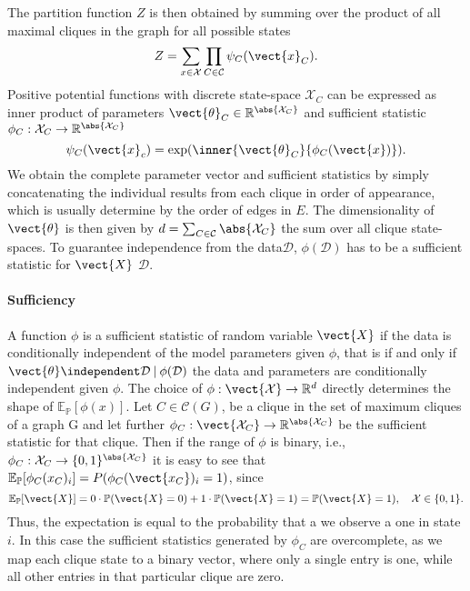 The partition function $Z$ is then obtained by summing over the product of all maximal cliques in the graph for all possible states
\begin{equation}
    Z = \sum_{x\in \mathcal{X}} \prod_{C \in \mathcal{C}} \psi_C(\vect{x}_C).
\end{equation}
Positive potential functions with discrete state-space $\mathcal{X}_C$ can be expressed as inner product of parameters $\vect{\theta}_C \in \mathbb{R}^{\abs{\mathcal{X}_C}}$ and sufficient statistic $\phi_C: \mathcal{X}_C \rightarrow \mathbb{R}^{\abs{\mathcal{X}_C}}$ 
\begin{equation}
    \psi_C(\vect{x}_c) = \exp(\inner{\vect{\theta}_C}{\phi_C(\vect{x})}).
\end{equation}
We obtain the complete parameter vector and sufficient statistics by simply concatenating the individual results from each clique in order of appearance, which is usually determine by the order of edges in $E$.
The dimensionality of $\vect{\theta}$ is then given by $d = \sum_{C \in \mathcal{C}} \abs{\mathcal{X}_C}$ the sum over all clique state-spaces.
To guarantee independence from the data$\mathcal{D}$,  $\phi(\mathcal{D})$ has to be a sufficient statistic for $\vect{X}$ \wrt $\mathcal{D}$.
\paragraph*{Sufficiency}
    A function $\phi$  is a sufficient statistic of random variable $\vect{X}$ if the data is conditionally independent of the model parameters given $\phi$, that is if and only if $\vect{\theta}\independent \mathcal{D} \:\lvert\: \phi(\mathcal{D})$ the data and parameters are conditionally independent given $\phi$.
    The choice of $\phi: \vect{\mathcal{X}} \rightarrow \mathbb{R}^d$ directly determines the shape of  $\mathbb{E}_{\mathbb{P}}[\phi(x)]$.
    Let $C \in \mathcal{C}(G)$, be a clique in the set of maximum cliques of a graph G and let further
    $\phi_C: \vect{\mathcal{X}_C} \rightarrow \mathbb{R}^{\abs{\mathcal{X}_C}}$ be the sufficient statistic for that clique.
    Then if the range of $\phi$ is binary, i.e., $\phi_C : \mathcal{X}_C \rightarrow \{0,1\}^{\abs{\mathcal{X}_C}}$ it is easy to see that  $\mathbb{E}_{\mathbb{P}}[\phi_C(x_C)_i] = P(\phi_C(\vect{x_C})_i = 1)$, since
    \begin{equation}
        \mathbb{E}_{\mathbb{P}}[\vect{X}] = 0 \cdot \mathbb{P}(\vect{X} = 0) + 1 \cdot \mathbb{P}(\vect{X}= 1) = \mathbb{P}(\vect{X} = 1), \quad \mathcal{X} \in \{0,1\}.
    \end{equation}
    Thus, the expectation is equal to the probability that a we observe a one in state $i$.
    In this case the sufficient statistics generated by $\phi_C$ are overcomplete, as we map each clique state to a binary vector, where only a single entry is one, while all other entries in that particular clique are zero.  


